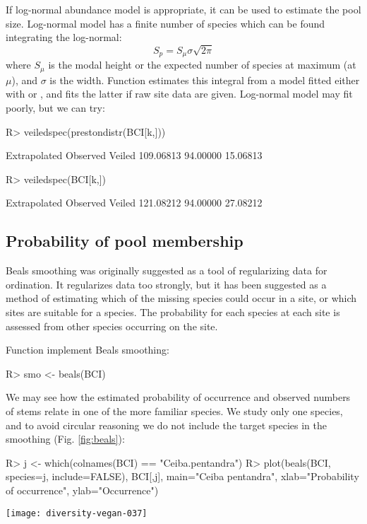 \documentclass[article,nojss]{jss}
\begin{document}
If log-normal abundance model is appropriate, it can be used to
estimate the pool size.  Log-normal model has a finite number of
species which can be found integrating the log-normal:
\begin{equation}
S_p = S_\mu \sigma \sqrt{2 \pi}
\end{equation}
where $S_\mu$ is the modal height or the expected number of species at
maximum (at $\mu$), and $\sigma$ is the width.  Function
 estimates this integral from a model fitted either
with  or , and fits the latter
if raw site data are given.  Log-normal model may fit poorly, but we
can try:
\begin{Schunk}
\begin{Sinput}
R> veiledspec(prestondistr(BCI[k,]))
\end{Sinput}
\begin{Soutput}
Extrapolated     Observed       Veiled 
   109.06813     94.00000     15.06813 
\end{Soutput}
\begin{Sinput}
R> veiledspec(BCI[k,])
\end{Sinput}
\begin{Soutput}
Extrapolated     Observed       Veiled 
   121.08212     94.00000     27.08212 
\end{Soutput}
\end{Schunk}

\subsection{Probability of pool membership}

Beals smoothing was originally suggested as a tool of regularizing data
for ordination.  It regularizes data too strongly,
but it has been suggested as a method of estimating which of the
missing species could occur in a site, or which sites are suitable for
a species.  The probability for each species at each site is assessed
from other species occurring on the site.

Function  implement Beals smoothing:
\begin{Schunk}
\begin{Sinput}
R> smo <- beals(BCI)
\end{Sinput}
\end{Schunk}
We may see how the estimated probability of occurrence and observed
numbers of stems relate in one of the more familiar species. We study
only one species, and to avoid circular reasoning we do not include
the target species in the smoothing (Fig. \ref{fig:beals}):
\begin{Schunk}
\begin{Sinput}
R> j <- which(colnames(BCI) == "Ceiba.pentandra")
R> plot(beals(BCI, species=j, include=FALSE), BCI[,j], main="Ceiba pentandra", xlab="Probability of occurrence", ylab="Occurrence")
\end{Sinput}
\end{Schunk}
\begin{SCfigure}
\texttt{[image: diversity-vegan-037]}
\caption{Beals smoothing for \emph{Ceiba pentandra}.}
\label{fig:beals}
\end{SCfigure}
\end{document}
